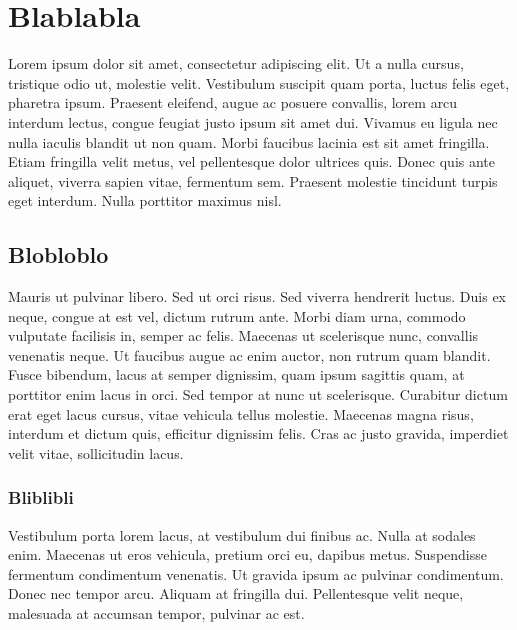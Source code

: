 \documentclass[12pt]{article}
\begin{document}
\tableofcontents
\pagebreak


\section{Blablabla}
Lorem ipsum dolor sit amet, consectetur adipiscing elit. Ut a nulla cursus, tristique odio ut, molestie velit. Vestibulum suscipit quam porta, luctus felis eget, pharetra ipsum. Praesent eleifend, augue ac posuere convallis, lorem arcu interdum lectus, congue feugiat justo ipsum sit amet dui. Vivamus eu ligula nec nulla iaculis blandit ut non quam. Morbi faucibus lacinia est sit amet fringilla. Etiam fringilla velit metus, vel pellentesque dolor ultrices quis. Donec quis ante aliquet, viverra sapien vitae, fermentum sem. Praesent molestie tincidunt turpis eget interdum. Nulla porttitor maximus nisl. 
\subsection{Blobloblo}
Mauris ut pulvinar libero. Sed ut orci risus. Sed viverra hendrerit luctus. Duis ex neque, congue at est vel, dictum rutrum ante. Morbi diam urna, commodo vulputate facilisis in, semper ac felis. Maecenas ut scelerisque nunc, convallis venenatis neque. Ut faucibus augue ac enim auctor, non rutrum quam blandit. Fusce bibendum, lacus at semper dignissim, quam ipsum sagittis quam, at porttitor enim lacus in orci. Sed tempor at nunc ut scelerisque. Curabitur dictum erat eget lacus cursus, vitae vehicula tellus molestie. Maecenas magna risus, interdum et dictum quis, efficitur dignissim felis. Cras ac justo gravida, imperdiet velit vitae, sollicitudin lacus. 
\subsubsection{Bliblibli}
Vestibulum porta lorem lacus, at vestibulum dui finibus ac. Nulla at sodales enim. Maecenas ut eros vehicula, pretium orci eu, dapibus metus. Suspendisse fermentum condimentum venenatis. Ut gravida ipsum ac pulvinar condimentum. Donec nec tempor arcu. Aliquam at fringilla dui. Pellentesque velit neque, malesuada at accumsan tempor, pulvinar ac est. 
\end{document}
